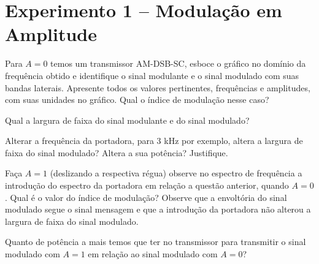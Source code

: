 \documentclass[12pt,addpoints]{exam}
\begin{document}
\section*{Experimento 1 -- Modulação em Amplitude}

\begin{questions}
    \question Para $A = 0$ temos um transmissor AM-DSB-SC, esboce o gráfico no domínio da frequência obtido e identifique o sinal modulante e o sinal modulado com suas bandas laterais. Apresente todos os valores pertinentes, frequências e amplitudes, com suas unidades no gráfico. Qual o índice de modulação nesse caso?
    \makeemptybox{5cm}
    
    \question Qual a largura de faixa do sinal modulante e do sinal modulado?
    \fillwithlines{0.5in}

    \question Alterar a frequência da portadora, para 3 kHz por exemplo, altera a largura de faixa do sinal modulado? Altera a sua potência? Justifique.
    \fillwithlines{0.75in}

    \question Faça $A = 1$ (deslizando a respectiva régua) observe no espectro de frequência a introdução do espectro da portadora  em relação a questão anterior, quando $A=0$. Qual é o valor do índice de modulação? Observe que a envoltória do sinal modulado segue o sinal mensagem e que a introdução da portadora não alterou a largura de faixa do sinal modulado. %
    \fillwithlines{0.5in}


    \question Quanto de potência a mais temos que ter no transmissor para transmitir o sinal modulado com $A=1$ em relação ao sinal modulado com $A=0$?
    \fillwithlines{0.5in}

    

\end{questions}
\end{document}
